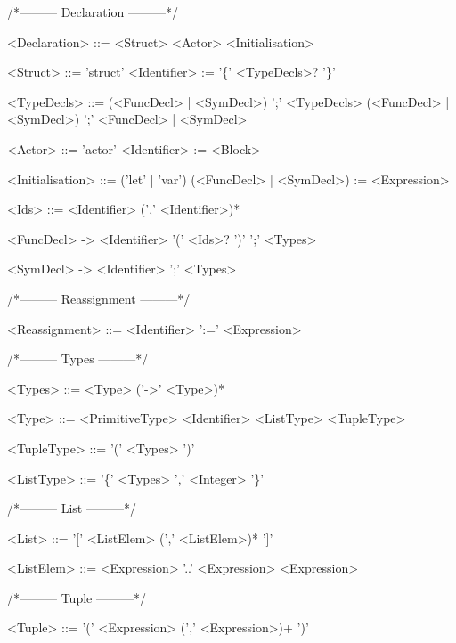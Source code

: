 /*--------- Declaration ---------*/
\begin{grammar}
<Declaration> ::= <Struct>
 \alt <Actor>
 \alt <Initialisation>

<Struct> ::= 'struct' <Identifier> := '\{' <TypeDecls>? '\}'

<TypeDecls> ::= (<FuncDecl> | <SymDecl>) ';' <TypeDecls>
 \alt (<FuncDecl> | <SymDecl>) ';'
 \alt <FuncDecl> | <SymDecl>

<Actor> ::= 'actor' <Identifier> := <Block>

<Initialisation> ::= ('let' | 'var') (<FuncDecl> | <SymDecl>) := <Expression>

<Ids> ::= <Identifier> (',' <Identifier>)*

<FuncDecl> -> <Identifier> '(' <Ids>? ')' ';' <Types>

<SymDecl> -> <Identifier> ';' <Types>
\end{grammar}
/*--------- Reassignment ---------*/
\begin{grammar}
<Reassignment> ::= <Identifier> ':=' <Expression>
\end{grammar}
/*--------- Types ---------*/
\begin{grammar}
<Types> ::= <Type> ('->' <Type>)*

<Type> ::= <PrimitiveType>
 \alt <Identifier>
 \alt <ListType>
 \alt <TupleType>

<TupleType> ::= '(' <Types> ')'

<ListType> ::= '\{' <Types> ',' <Integer> '\}'
\end{grammar}
/*--------- List ---------*/
\begin{grammar}
<List> ::= '[' <ListElem> (',' <ListElem>)* ']'

<ListElem> ::= <Expression> '..' <Expression>
 \alt <Expression>
\end{grammar}
/*--------- Tuple ---------*/
\begin{grammar}
<Tuple> ::= '(' <Expression> (',' <Expression>)+ ')'
\end{grammar}